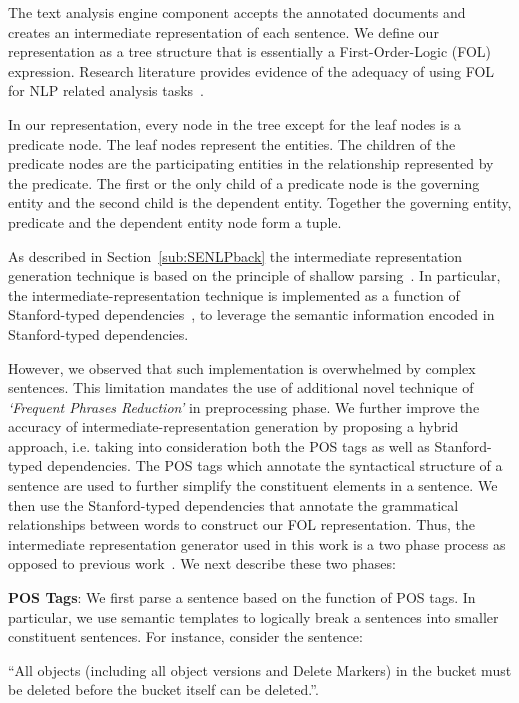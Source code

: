 The text analysis engine component accepts the annotated documents and creates an intermediate representation of each sentence.
We define our representation as a tree structure that is essentially a First-Order-Logic (FOL) expression.
Research literature provides evidence of the adequacy of using FOL for NLP related analysis tasks~\cite{Sinha2009,Sinha2010,pandita12:inferring, pandita13:WHYPER}.

In our representation, every node in the tree except for the leaf nodes is a predicate node. 
The leaf nodes represent the entities.
The children of the predicate nodes are the participating entities in the relationship represented by the predicate.
The first or the only child of a predicate node is the governing entity and the second child is the dependent entity.
Together the governing entity, predicate and the dependent entity node form a tuple.  


As described in Section~\ref{sub:SENLPback} the intermediate representation generation technique is based on the principle of shallow parsing~\cite{Branimir2000}. 
In particular, the intermediate-representation technique is implemented as a function of Stanford-typed dependencies~\cite{Marneffe06LREC,Marneffe08COLING,KleinNIPS03}, to leverage the semantic information encoded in Stanford-typed dependencies.


However, we observed that such implementation is overwhelmed by complex sentences.
This limitation mandates the use of additional novel technique of \textit{`Frequent Phrases Reduction'} in preprocessing phase.
We further improve the accuracy of intermediate-representation generation by proposing a hybrid approach, i.e. taking into consideration both the POS tags as well as Stanford-typed dependencies.
The POS tags which annotate the syntactical structure of a sentence are used to further simplify the constituent elements in a sentence. 
We then use the Stanford-typed dependencies that annotate the grammatical relationships between words to construct our FOL representation.
Thus, the intermediate representation generator used in this work is a two phase process as opposed to previous work~\cite{pandita12:inferring, pandita13:WHYPER}. 
We next describe these two phases:

\textbf{POS Tags}: We first parse a sentence based on the function of POS tags. 
In particular, we use semantic templates to logically break a sentences into smaller constituent sentences. 
For instance, consider the sentence:

\begin{center}
\scriptsize``All objects (including all object versions and Delete Markers) in the bucket must be deleted before the bucket itself can be deleted.''. \normalsize
\end{center}

